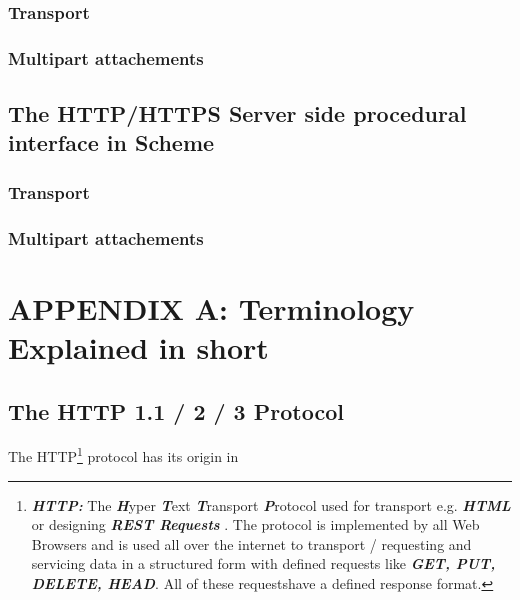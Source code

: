 \documentclass[10pt,a4paper,english]{article}
\newcommand{\abbrhighcol}[1]{\textbf{\textit{#1}}}
\begin{document}
\begin{multicols}{2}
\subsubsection{Transport}
\begin{flushleft}
\end{flushleft}
\subsubsection{Multipart attachements}
\begin{flushleft}
\end{flushleft}
\subsection{The HTTP/HTTPS Server side procedural interface in Scheme}
\begin{flushleft}
\end{flushleft}

\subsubsection{Transport}
\begin{flushleft}
\end{flushleft}
\subsubsection{Multipart attachements}
\begin{flushleft}
\end{flushleft}

\section{APPENDIX A: Terminology Explained in short}
\subsection{The HTTP 1.1 / 2 / 3 Protocol}
\begin{flushleft}
The HTTP\footnote{\abbrhighcol{HTTP:}  The \abbrhighcol{H}yper \abbrhighcol{T}ext \abbrhighcol {T}ransport \abbrhighcol {P}rotocol used for transport  e.g. \abbrhighcol{HTML} or designing  \abbrhighcol{REST Requests} . The protocol is implemented by all Web Browsers and is used all over the internet to transport / requesting and servicing data in a structured form with defined requests like \abbrhighcol{GET, PUT, DELETE, HEAD}. All of these requestshave a defined response format.} protocol has its origin in 
\end{flushleft}




\end{multicols}
\end{document}
